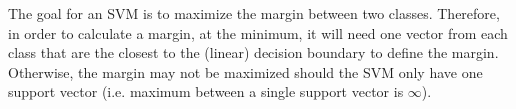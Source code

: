 \tftrue 

The goal for an SVM is to maximize the margin between two classes. Therefore, in order to calculate a margin, at the minimum, it will need one vector from each class that are the closest to the (linear) decision boundary to define the margin. Otherwise, the margin may not be maximized should the SVM only have one support vector (i.e. maximum between a single support vector is $\infty$).
